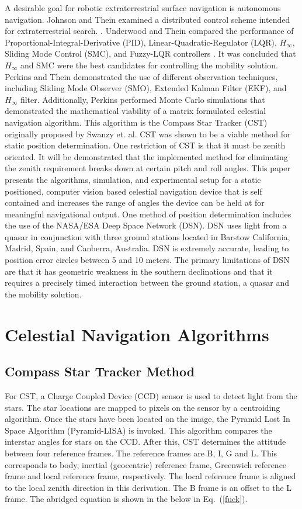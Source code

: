 \documentclass[]{aiaa-tc}%
\begin{document}
A desirable goal for robotic extraterrestrial surface navigation is autonomous navigation.  Johnson and Thein examined a distributed control scheme intended for extraterrestrial search. \cite{b:johnson}.  Underwood and Thein compared the performance of Proportional-Integral-Derivative (PID), Linear-Quadratic-Regulator (LQR), $H_{\infty}$, Sliding Mode Control (SMC), and Fuzzy-LQR controllers \cite{b:underwood}.  It was concluded that $H_{\infty}$ and SMC were the best candidates for controlling the mobility solution.  Perkins and Thein demonstrated the use of different observation techniques, including Sliding Mode Observer (SMO), Extended Kalman Filter (EKF), and $H_{\infty}$ filter\cite{b:perkins}.  Additionally, Perkins performed Monte Carlo simulations that demonstrated the mathematical viability of a matrix formulated celestial navigation algorithm.  This algorithm is the Compass Star Tracker (CST) originally proposed by Swanzy et. al\cite{b:swanzy}. CST was shown to be a viable method for static position determination. One restriction of CST is that it must be zenith oriented.  It will be demonstrated that the implemented method for eliminating the zenith requirement breaks down at certain pitch and roll angles.  This paper presents the algorithms, simulation, and experimental setup for a static positioned, computer vision based celestial navigation device that is self contained and increases the range of angles the device can be held at for meaningful navigational output.
One method of position determination includes the use of the NASA/ESA Deep Space Network (DSN).  DSN uses light from a quasar in conjunction with three ground stations located in Barstow California, Madrid, Spain, and Canberra, Australia\cite{b:dsn}. DSN is extremely accurate, leading to position error circles between 5 and 10 meters\cite{b:msla}. The primary limitations of DSN are that it has geometric weakness in the southern declinations and that it requires a precisely timed interaction between the ground station, a quasar and the mobility solution\cite{b:dor}.
\section{Celestial Navigation Algorithms}
\subsection*{Compass Star Tracker Method} 
For CST, a Charge Coupled Device (CCD) sensor is used to detect light from the stars.  The star locations are mapped to pixels on the sensor by a centroiding algorithm.  Once the stars have been located on the image, the Pyramid Lost In Space Algorithm (Pyramid-LISA) is invoked.  This algorithm compares the interstar angles for stars on the CCD\cite{b:lisa}.  After this, CST determines the attitude between four reference frames.  The reference frames are B, I, G and L.  This corresponds to body, inertial (geocentric) reference frame, Greenwich reference frame and local reference frame, respectively.  The local reference frame is aligned to the local zenith direction in this derivation. The B frame is an offset to the L frame.  The abridged equation is shown in the below in Eq.~(\ref{fuck}).
\end{document}

